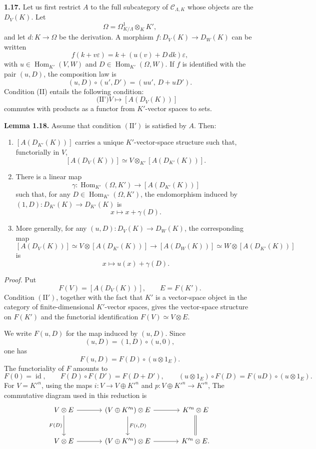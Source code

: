 \documentclass[11pt]{article}
\providecommand{\Hom}{\operatorname{Hom}}
\begin{document}
\textbf{1.17.} Let us first restrict \(A\) to the full subcategory of
\(\mathcal C_{\Lambda,K}\) whose objects are the \(D_V(K)\). Let
\[
 \Omega=\Omega^1_{K/\Lambda}\otimes_K K',
\]
and let \(d:K\to \Omega\) be the derivation. A morphism
\(f:D_V(K)\to D_W(K)\) can be written
\[
 f(k+v\varepsilon)=k+(u(v)+D\,dk)\varepsilon,
\]
with \(u\in\Hom_{K'}(V,W)\) and \(D\in\Hom_{K'}(\Omega,W)\). If \(f\) is identified
with the pair \((u,D)\), the composition law is
\[
 (u,D)\circ(u',D')=(uu',\,D+uD').
\]
Condition (II) entails the following condition:
\[
\qquad\text{(II')}
 V\longmapsto [A(D_V(K))]
\]
commutes with products as a functor from \(K'\)-vector spaces to sets.

\textbf{Lemma 1.18.} Assume that condition \((\mathrm{II}')\) is satisfied by \(A\). Then:

\begin{enumerate}[label=(\arabic*)]
\item \([A(D_{K'}(K))]\) carries a unique \(K'\)-vector-space structure such that, functorially in
\(V\),
\[
 [A(D_V(K))]\simeq V\otimes_{K'}[A(D_{K'}(K))].
\]
\item There is a linear map
\[
 \gamma:\Hom_{K'}(\Omega,K')\longrightarrow [A(D_{K'}(K))]
\]
such that, for any \(D\in\Hom_{K'}(\Omega,K')\), the endomorphism induced by
\((1,D):D_{K'}(K)\to D_{K'}(K)\) is
\[
 x\longmapsto x+\gamma(D).
\]
\item More generally, for any \((u,D):D_V(K)\to D_W(K)\), the corresponding map
\[
 [A(D_V(K))]\simeq V\otimes[A(D_{K'}(K))]
 \longrightarrow
 [A(D_W(K))]\simeq W\otimes[A(D_{K'}(K))]
\]
is
\[
 x\longmapsto u(x)+\gamma(D).
\]
\end{enumerate}

\emph{Proof.} Put
\[
 F(V)=[A(D_V(K))],\qquad E=F(K').
\]
Condition \((\mathrm{II}')\), together with the fact that \(K'\) is a vector-space
object in the category of finite-dimensional \(K'\)-vector spaces, gives the vector-space
structure on \(F(K')\) and the functorial identification \(F(V)\simeq V\otimes E\).

We write \(F(u,D)\) for the map induced by \((u,D)\). Since
\[
 (u,D)=(1,D)\circ(u,0),
\]
one has
\[
 F(u,D)=F(D)\circ(u\otimes 1_E).
\]
The functoriality of \(F\) amounts to
\[
 F(0)=\operatorname{id},\qquad
 F(D)\circ F(D')=F(D+D'),\qquad
 (u\otimes 1_E)\circ F(D)=F(uD)\circ(u\otimes 1_E).
\]
For \(V=K'^n\), using the maps \(i:V\to V\oplus K'^n\) and
\(p:V\oplus K'^n\to K'^n\), 
The commutative diagram used in this reduction is
\[
\begin{tikzcd}[column sep=large,row sep=large]
V\otimes E \arrow[r] \arrow[d,"F(D)"'] &
(V\oplus K'^n)\otimes E \arrow[r] \arrow[d,"{F(i,D)}"] &
K'^n\otimes E \arrow[d,equal]\\
V\otimes E \arrow[r] &
(V\oplus K'^n)\otimes E \arrow[r] &
K'^n\otimes E .
\end{tikzcd}
\]
\end{document}
